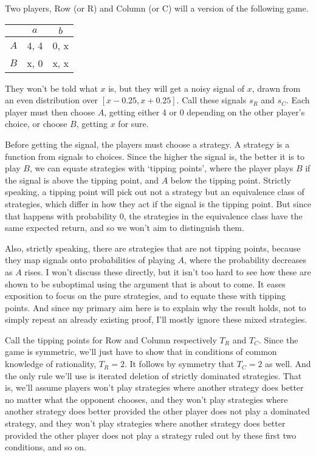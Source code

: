 Two players, Row (or R) and Column (or C) will a version of the following game.

\begin{center}
\begin{tabular}{r | c c}
& $a$ & $b$ \\\hline
$A$ & 4, 4 & 0, x \\
$B$ & x, 0 & x, x
\end{tabular}
\end{center}
They won't be told what $x$ is, but they will get a noisy signal of $x$, drawn from an even distribution over $[x - 0.25, x + 0.25]$. Call these signals $s_R$ and $s_C$. Each player must then choose $A$, getting either 4 or 0 depending on the other player's choice, or choose $B$, getting $x$ for sure. 

Before getting the signal, the players must choose a strategy. A strategy is a function from signals to choices. Since the higher the signal is, the better it is to play $B$, we can equate strategies with `tipping points', where the player plays $B$ if the signal is above the tipping point, and $A$ below the tipping point. Strictly speaking, a tipping point will pick out not a strategy but an equivalence class of strategies, which differ in how they act if the signal is the tipping point. But since that happens with probability 0, the strategies in the equivalence class have the same expected return, and so we won't aim to distinguish them.

Also, strictly speaking, there are strategies that are not tipping points, because they map signals onto probabilities of playing $A$, where the probability decreases as $A$ rises. I won't discuss these directly, but it isn't too hard to see how these are shown to be suboptimal using the argument that is about to come. It eases exposition to focus on the pure strategies, and to equate these with tipping points. And since my primary aim here is to explain why the result holds, not to simply repeat an already existing proof, I'll mostly ignore these mixed strategies.

Call the tipping points for Row and Column respectively $T_R$ and $T_C$. Since the game is symmetric, we'll just have to show that in conditions of common knowledge of rationality, $T_R = 2$. It follows by symmetry that $T_C = 2$ as well. And the only rule we'll use is iterated deletion of strictly dominated strategies. That is, we'll assume players won't play strategies where another strategy does better no matter what the opponent chooses, and they won't play strategies where another strategy does better provided the other player does not play a dominated strategy, and they won't play strategies where another strategy does better provided the other player does not play a strategy ruled out by these first two conditions, and so on.

